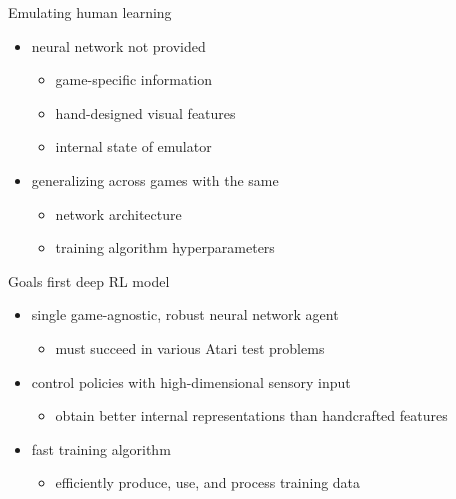 \begin{frame}{Emulating human learning}
    \begin{itemize}\itemsep=12pt
        
        \item neural network not provided
        \vspace*{0.5em}
        \begin{itemize}
            \item game-specific information
            \item hand-designed visual features
            \item internal state of emulator
        \end{itemize}

        \item generalizing across games with the same
        \vspace*{0.5em}
        \begin{itemize}
            \item network architecture
            \item training algorithm hyperparameters
        \end{itemize}

    \end{itemize}
\end{frame}

\begin{frame}{Goals}
    first deep RL model
    \vspace*{0.5em}
    \begin{itemize}\itemsep=12pt
        
        \item single game-agnostic, robust neural network agent
        \vspace*{0.5em}
        \begin{itemize}
            \item must succeed in various Atari test problems
        \end{itemize}

        \item control policies with high-dimensional sensory input
        \vspace*{0.5em}
        \begin{itemize}
            \item obtain better internal representations than handcrafted features
        \end{itemize}

        \item fast training algorithm
        \vspace*{0.5em}
        \begin{itemize}
            \item efficiently produce, use, and process training data
        \end{itemize}

    \end{itemize}
\end{frame}

